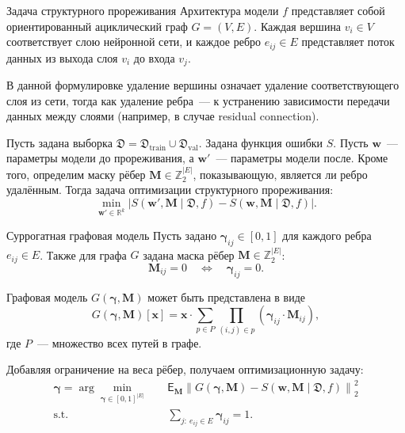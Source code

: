 \documentclass{beamer}
\begin{document}
\begin{frame}{Задача структурного прореживания}
    Архитектура модели $f$ представляет собой ориентированный ациклический граф $G = (V, E)$. Каждая вершина $v_i \in V$ соответствует слою нейронной сети, и каждое ребро $e_{ij} \in E$ представляет поток данных из выхода слоя $v_i$ до входа $v_j$. 

    \vspace{10pt}
    
    В данной формулировке удаление вершины означает удаление соответствующего слоя из сети, тогда как удаление ребра~--- к устранению зависимости передачи данных между слоями (например, в случае residual connection).

    \vspace{10pt}
    
    Пусть задана выборка $\mathfrak{D} = \mathfrak{D}_\text{train} \cup \mathfrak{D}_\text{val}$. Задана функция ошибки $S$. Пусть $\mathbf{w}$~--- параметры модели до прореживания, а $\mathbf{w}'$~--- параметры модели после. Кроме того, определим маску рёбер $\mathbf{M} \in \mathbb{Z}_2^{|E|}$, показывающую, является ли ребро удалённым. Тогда задача оптимизации структурного прореживания:
        $$\min_{\mathbf{w}' \in \mathbb{R}^k}
    \left|
    S(\mathbf{w}', \mathbf{M} \mid \mathfrak{D}, f)
    -
    S(\mathbf{w}, \mathbf{M} \mid \mathfrak{D}, f)
    \right|.$$
    
\end{frame}

\begin{frame}{Суррогатная графовая модель}
    \small
   Пусть задано $\boldsymbol{\gamma}_{ij} \in [0, 1]$ для каждого ребра $e_{ij} \in E$. Также для графа $G$ задана маска рёбер $\mathbf{M} \in \mathbb{Z}_2^{|E|}$:
        $$ \mathbf{M}_{ij} = 0 \quad \Leftrightarrow \quad \boldsymbol{\gamma}_{ij} = 0.$$

    \vspace{10pt}
    
    \begin{lemma}
    Графовая модель $G(\boldsymbol{\gamma}, \mathbf{M})$ может быть представлена в виде
    $$
    G(\boldsymbol{\gamma}, \mathbf{M})[\mathbf{x}] = \mathbf{x} \cdot \sum_{p \in P} \prod_{(i,j) \in p} \left( \boldsymbol{\gamma}_{ij} \cdot \mathbf{M}_{ij} \right),
    $$
    где $P$~--- множество всех путей в графе.
    \end{lemma}

    \vspace{10pt}

    Добавляя ограничение на веса рёбер, получаем оптимизационную задачу:
    $$
    \begin{aligned}
    \boldsymbol{\gamma}
    =
    \arg\min_{\boldsymbol{\gamma} \in [0,1]^{|E|}}
    \quad
    & \mathsf{E}_{\mathbf{M}}
    \left\|
    G(\boldsymbol{\gamma}, \mathbf{M})
    -
    S(\mathbf{w}, \mathbf{M} \mid \mathfrak{D}, f)
    \right\|_2^2
    \\
    \textrm{s.t.} \quad
    &
    \sum_{j:\ e_{ij} \in E} \boldsymbol{\gamma}_{ij} = 1.
    \end{aligned}
    $$
\end{frame}
\end{document}
